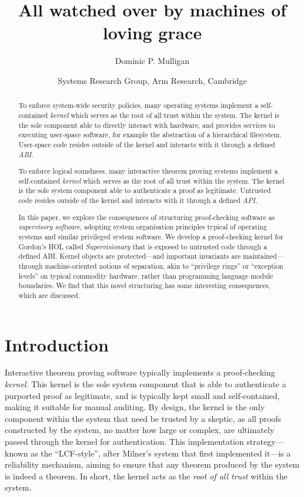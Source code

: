 \documentclass[a4paper, 10pt]{article}
\title{All watched over by machines of loving grace}
\author{Dominic P. Mulligan}
\date{Systems Research Group, Arm Research, Cambridge}
\begin{document}
\maketitle

\begin{abstract}
To enforce system-wide security policies, many operating systems implement a self-contained \emph{kernel} which serves as the root of all trust within the system.
The kernel is the sole component able to directly interact with hardware, and provides services to executing user-space software, for example the abstraction of a hierarchical filesystem.
User-space code resides outside of the kernel and interacts with it through a defined \emph{ABI}.

To enforce logical soundness, many interactive theorem proving systems implement a self-contained \emph{kernel} which serves as the root of all trust within the system.
The kernel is the sole system component able to authenticate a proof as legitimate.
Untrusted code resides outside of the kernel and interacts with it through a defined \emph{API}.

In this paper, we explore the consequences of structuring proof-checking software as \emph{supervisory software}, adopting system organisation principles typical of operating systems and similar privileged system software.
We develop a proof-checking kernel for Gordon's HOL called \emph{Supervisionary} that is exposed to untrusted code through a defined ABI.
Kernel objects are protected---and important invariants are maintained---through machine-oriented notions of separation, akin to ``privilege rings'' or ``exception levels'' on typical commodity hardware, rather than programming language module boundaries.
We find that this novel structuring has some interesting consequences, which are discussed.
\end{abstract}

\section{Introduction}
\label{sect.introduction}

Interactive theorem proving software typically implements a proof-checking \emph{kernel}.
This kernel is the sole system component that is able to authenticate a purported proof as legitimate, and is typically kept small and self-contained, making it suitable for manual auditing.
By design, the kernel is the only component within the system that need be trusted by a skeptic, as all proofs constructed by the system, no matter how large or complex, are ultimately passed through the kernel for authentication.
This implementation strategy---known as the ``LCF-style'', after Milner's system that first implemented it---is a reliability mechanism, aiming to ensure that any theorem produced by the system is indeed a theorem.
In short, the kernel acts as the \emph{root of all trust} within the system.
\end{document}
